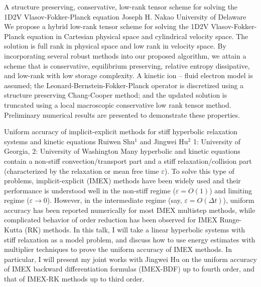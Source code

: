 \vspace{1.5ex}
\abs
{A structure preserving, conservative, low-rank tensor scheme for solving the 1D2V Vlasov-Fokker-Planck equation}
{Joseph H. Nakao}
{University of Delaware}
{We propose a hybrid low-rank tensor scheme for solving the 1D2V Vlasov-Fokker-Planck equation in Cartesian physical space and cylindrical velocity space. The solution is full rank in physical space and low rank in velocity space. By incorporating several robust methods into our proposed algorithm, we attain a scheme that is conservative, equilibrium preserving, relative entropy dissipative, and low-rank with low storage complexity. A kinetic ion -- fluid electron model is assumed; the Leonard-Bernstein-Fokker-Planck operator is discretized using a structure preserving Chang-Cooper method; and the updated solution is truncated using a local macroscopic conservative low rank tensor method. Preliminary numerical results are presented to demonstrate these properties.}

\vspace{1.5ex}
\abs
{Uniform accuracy of implicit-explicit methods for stiff hyperbolic relaxation systems and kinetic equations}
{Ruiwen Shu$^{1}$ and Jingwei Hu$^{2}$}
{1: University of Georgia, 2: University of Washington}
{Many hyperbolic and kinetic equations contain a non-stiff convection/transport part and a stiff relaxation/collision part (characterized by the relaxation or mean free time $\varepsilon$). To solve this type of problems, implicit-explicit (IMEX) methods have been widely used and their performance is understood well in the non-stiff regime ($\varepsilon=O(1)$) and limiting regime ($\varepsilon\rightarrow 0$). However, in the intermediate regime (say, $\varepsilon=O(\Delta t)$), uniform accuracy has been reported numerically for most IMEX multistep methods, while complicated behavior of order reduction has been observed for IMEX Runge-Kutta (RK) methods. In this talk, I will take a linear hyperbolic systems with stiff relaxation as a model problem, and discuss how to use energy estimates with multiplier techniques to prove the uniform accuracy of IMEX methods. In particular, I will present my joint works with Jingwei Hu on the uniform accuracy of IMEX backward differentiation formulas (IMEX-BDF) up to fourth order, and that of IMEX-RK methods up to third order.}